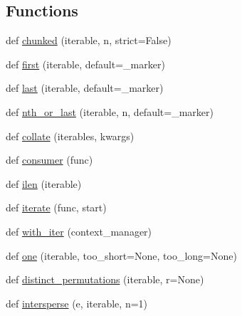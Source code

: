 \subsection*{Functions}
\begin{DoxyCompactItemize}
\item 
def \hyperlink{namespacesetuptools_1_1__vendor_1_1more__itertools_1_1more_a4e54f042cb33c767fc916b14cc8f1a29}{chunked} (iterable, n, strict=False)
\item 
def \hyperlink{namespacesetuptools_1_1__vendor_1_1more__itertools_1_1more_a74224dd623db9ad4e472e637a282d5d4}{first} (iterable, default=\+\_\+marker)
\item 
def \hyperlink{namespacesetuptools_1_1__vendor_1_1more__itertools_1_1more_a86971974b505201c4419bd8aad9d1866}{last} (iterable, default=\+\_\+marker)
\item 
def \hyperlink{namespacesetuptools_1_1__vendor_1_1more__itertools_1_1more_a6d9ade86fac5ccaff3d9591dd143575a}{nth\+\_\+or\+\_\+last} (iterable, n, default=\+\_\+marker)
\item 
def \hyperlink{namespacesetuptools_1_1__vendor_1_1more__itertools_1_1more_a7704c89f2e7f53903f060c465dbae459}{collate} (iterables, kwargs)
\item 
def \hyperlink{namespacesetuptools_1_1__vendor_1_1more__itertools_1_1more_aba2bfd3e5689d1d8c07b735f8e3c1f3d}{consumer} (func)
\item 
def \hyperlink{namespacesetuptools_1_1__vendor_1_1more__itertools_1_1more_a7ee771b986b4c83b08e8743d5402df06}{ilen} (iterable)
\item 
def \hyperlink{namespacesetuptools_1_1__vendor_1_1more__itertools_1_1more_a03e89578244dcd6cc1bdb6e2399ad6f6}{iterate} (func, start)
\item 
def \hyperlink{namespacesetuptools_1_1__vendor_1_1more__itertools_1_1more_afd15440600ce48655fcc376a543f17ab}{with\+\_\+iter} (context\+\_\+manager)
\item 
def \hyperlink{namespacesetuptools_1_1__vendor_1_1more__itertools_1_1more_a86598b2a838b7562a0cc40e362020a28}{one} (iterable, too\+\_\+short=None, too\+\_\+long=None)
\item 
def \hyperlink{namespacesetuptools_1_1__vendor_1_1more__itertools_1_1more_a133d88653cbeea402678991e251a01ef}{distinct\+\_\+permutations} (iterable, r=None)
\item 
def \hyperlink{namespacesetuptools_1_1__vendor_1_1more__itertools_1_1more_a2449b22e6f45c7532810cf3bda514ac5}{intersperse} (e, iterable, n=1)
\item 

\end{DoxyCompactItemize}
